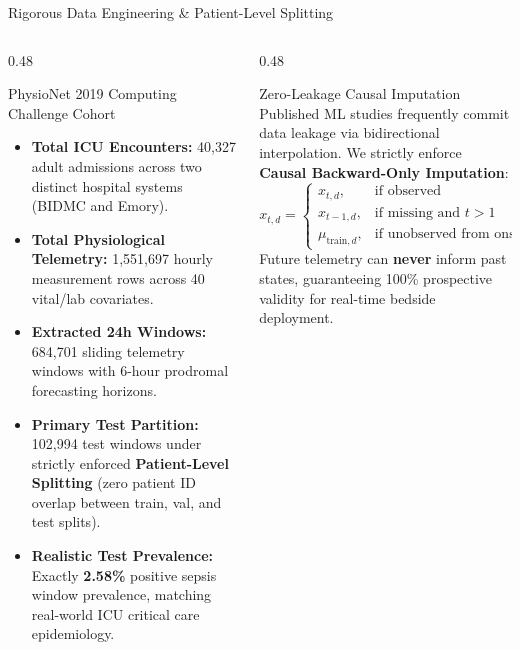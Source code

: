 \documentclass[aspectratio=169, 10pt]{beamer}
\begin{document}
\begin{frame}{Rigorous Data Engineering \& Patient-Level Splitting}
    \begin{columns}[t]
        \begin{column}{0.48\textwidth}
            \begin{block}{PhysioNet 2019 Computing Challenge Cohort}
                \scriptsize
                \begin{itemize}
                    \item \textbf{Total ICU Encounters:} 40,327 adult admissions across two distinct hospital systems (BIDMC and Emory).
                    \item \textbf{Total Physiological Telemetry:} 1,551,697 hourly measurement rows across 40 vital/lab covariates.
                    \item \textbf{Extracted 24h Windows:} 684,701 sliding telemetry windows with 6-hour prodromal forecasting horizons.
                    \item \textbf{Primary Test Partition:} 102,994 test windows under strictly enforced \textbf{Patient-Level Splitting} (zero patient ID overlap between train, val, and test splits).
                    \item \textbf{Realistic Test Prevalence:} Exactly \textbf{2.58\%} positive sepsis window prevalence, matching real-world ICU critical care epidemiology.
                \end{itemize}
            \end{block}
        \end{column}
        
        \begin{column}{0.48\textwidth}
            \begin{alertblock}{Zero-Leakage Causal Imputation}
                \scriptsize
                Published ML studies frequently commit data leakage via bidirectional interpolation. We strictly enforce \textbf{Causal Backward-Only Imputation}:
                \begin{equation*}
                    x_{t, d} = 
                    \begin{cases} 
                    x_{t, d}, & \text{if observed} \\
                    x_{t-1, d}, & \text{if missing and } t > 1 \\
                    \mu_{\text{train}, d}, & \text{if unobserved from onset}
                    \end{cases}
                \end{equation*}
                Future telemetry can \textbf{never} inform past states, guaranteeing 100\% prospective validity for real-time bedside deployment.
            \end{alertblock}
            

\end{column}
\end{columns}
\end{frame}
\end{document}
